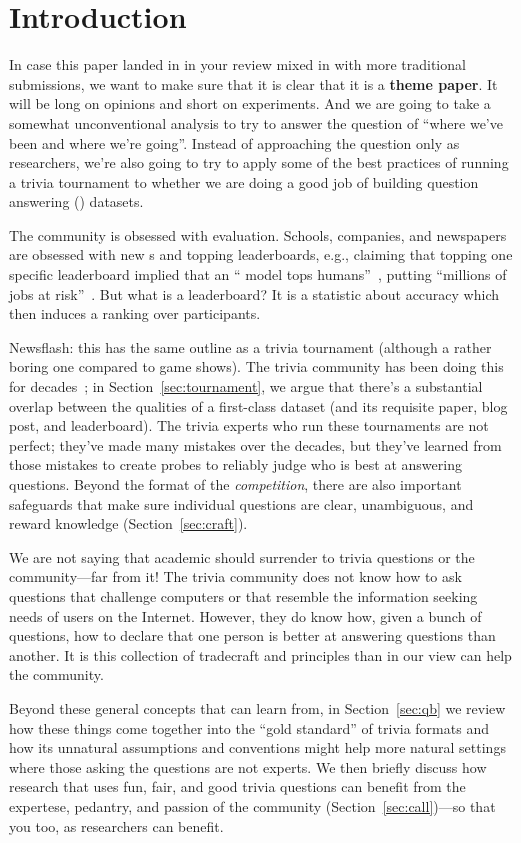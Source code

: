 

\section{Introduction}


In case this paper landed in in your review mixed in with more traditional  submissions, we want to make sure that it is clear that it is a {\bf theme paper}.
It will be long on opinions and short on experiments.
And we are going to take a somewhat unconventional analysis to try to answer the question of ``where we've been and where we're going''.
Instead of approaching the question only as  researchers, we're also going to try to apply some of the best practices of running a trivia tournament to whether we are doing a good job of building question answering () datasets.

The \qa{} community is obsessed with evaluation.
Schools, companies, and newspapers are obsessed with new s and
topping leaderboards, e.g., claiming that topping one specific leaderboard implied that an `` model tops humans''~\cite{najberg-18}, putting ``millions of jobs at risk''~\cite{cuthbertson-18}.
But what is a leaderboard? 
It is a statistic about \qa{} accuracy which then induces a ranking over participants.

Newsflash: this has the same outline as a trivia tournament (although a rather boring one compared to game shows).  
The trivia community has been doing this for decades~\cite{jennings-06}; in
Section~\ref{sec:tournament}, we argue that there's a substantial
overlap between the qualities of a first-class  dataset (and
its requisite paper, blog post, and leaderboard).
The trivia experts who run these tournaments are not perfect; they've
made many mistakes over the decades, but they've learned from those
mistakes to create probes to reliably judge who is best at answering
questions.
Beyond the format of the \emph{competition}, there are also important
safeguards that make sure individual questions are clear, unambiguous,
and reward knowledge (Section~\ref{sec:craft}).

We are not saying that academic  should surrender to trivia questions or the community---far from it!
The trivia community does not know how to ask questions that challenge computers or that resemble the information seeking needs of users on the Internet.
However, they do know how, given a bunch of questions, how to declare that one person is better at answering questions than another.
It is this collection of tradecraft and principles than in our view can help the  community.

Beyond these general concepts that  can learn from, in
Section~\ref{sec:qb} we review how these things come together into the ``gold standard'' of trivia formats and how its unnatural assumptions and conventions might help more natural  settings where those asking the questions are not experts.
We then briefly discuss how research that uses fun, fair, and good
trivia questions can benefit from the expertese, pedantry, and passion
of the community (Section~\ref{sec:call})---so that you too, as
researchers can benefit.